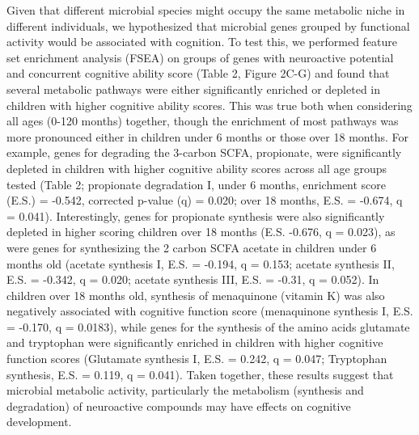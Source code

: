 \documentclass{article}
\begin{document}
Given that different microbial species might occupy the same metabolic
niche in different individuals, we hypothesized that microbial genes
grouped by functional activity would be associated with cognition. To
test this, we performed feature set enrichment analysis (FSEA) on groups
of genes with neuroactive potential
\cite{valles-colomerNeuroactivePotentialHuman2019}
and concurrent cognitive ability score (Table 2, Figure 2C-G) and found that
several metabolic pathways were either significantly enriched or depleted in
children with higher cognitive ability scores. This was true both when
considering all ages (0-120 months) together, though the enrichment of most
pathways was more pronounced either in children under 6 months or those over 18
months. For example, genes for degrading the 3-carbon SCFA, propionate,
were significantly depleted in children with higher cognitive ability
scores across all age groups tested (Table 2; propionate degradation I,
under 6 months, enrichment score (E.S.) = -0.542, corrected p-value (q)
= 0.020; over 18 months, E.S. = -0.674, q = 0.041). Interestingly, genes
for propionate synthesis were also significantly depleted in higher
scoring children over 18 months (E.S. -0.676, q = 0.023), as were genes
for synthesizing the 2 carbon SCFA acetate in children under 6 months
old (acetate synthesis I, E.S. = -0.194, q = 0.153; acetate synthesis
II, E.S. = -0.342, q = 0.020; acetate synthesis III, E.S. = -0.31, q = 0.052).
In children over 18 months old, synthesis of menaquinone (vitamin K)
was also negatively associated with cognitive function score (menaquinone synthesis I,
E.S. = -0.170, q = 0.0183), while
genes for the synthesis of the amino acids
glutamate and tryptophan were significantly enriched in children with
higher cognitive function scores (Glutamate synthesis I, E.S. = 0.242, 
q = 0.047; Tryptophan synthesis, E.S. = 0.119, q = 0.041).
Taken together, these results suggest that
microbial metabolic activity, particularly the metabolism (synthesis and
degradation) of neuroactive compounds may have effects on cognitive
development.
\end{document}
